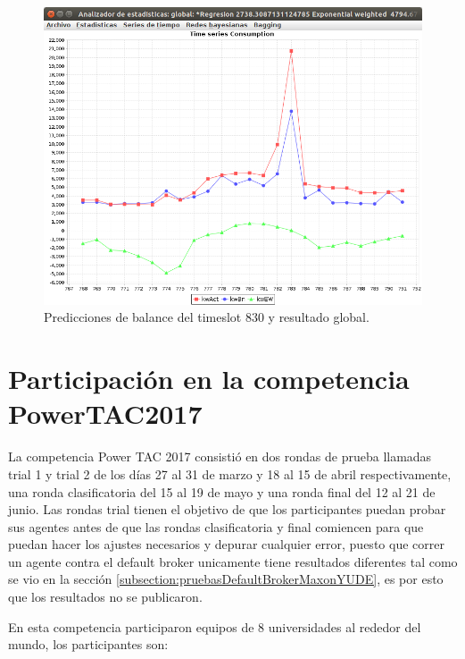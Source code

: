 \begin{figure}[h]
	\centering
	\includegraphics[width=12cm]{img/comparacionNuevoConAnterior3agentes.png}
	\caption{Predicciones de balance del timeslot 830 y resultado global. }
	\label{fig:comparacionNuevoConAnterior3agentes}
\end{figure}
\clearpage
\section{Participación en la competencia PowerTAC2017} \label{subsec:participacionComp}

La competencia Power TAC 2017 consistió en dos rondas de prueba llamadas trial 1 y trial 2 de los días 27 al 31 de marzo y 18 al 15 de abril respectivamente, una ronda clasificatoria del 15 al 19 de mayo y una ronda final del 12 al 21 de junio. 
Las rondas trial tienen el objetivo de que los participantes puedan probar sus agentes antes de que las rondas clasificatoria y final comiencen para que puedan hacer los ajustes necesarios y depurar cualquier error, puesto que correr un agente contra el default broker unicamente tiene resultados diferentes tal como se vio en la sección \ref{subsection:pruebasDefaultBrokerMaxonYUDE}, es por esto que los resultados no se publicaron.

En esta competencia participaron equipos de 8 universidades al rededor del mundo, los participantes son:

